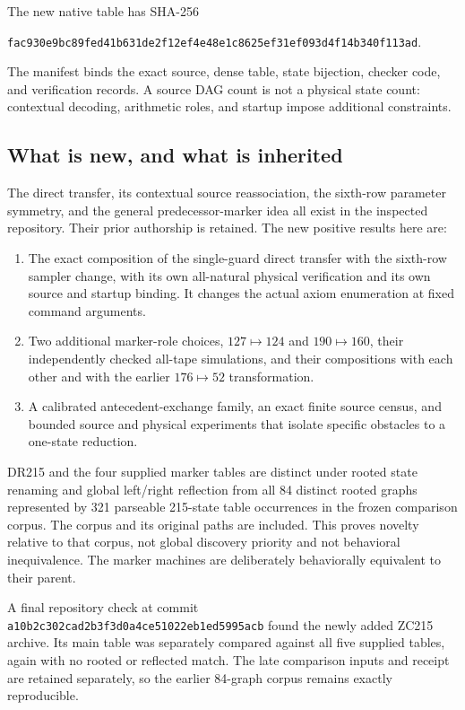 \documentclass[11pt,a4paper]{article}
\theoremstyle{definition}
\numberwithin{equation}{section}
\begin{document}
The new native table has SHA-256
\begin{center}\small
\texttt{fac930e9bc89fed41b631de2f12ef4e48e1c8625ef31ef093d4f14b340f113ad}.
\end{center}
The manifest binds the exact source, dense table, state bijection, checker
code, and verification records. A source DAG count is not a physical state
count: contextual decoding, arithmetic roles, and startup impose additional
constraints.

\subsection{What is new, and what is inherited}

The direct transfer, its contextual source reassociation, the sixth-row
parameter symmetry, and the general predecessor-marker idea all exist in
the inspected repository. Their prior authorship is retained. The new
positive results here are:

\begin{enumerate}
\item The exact composition of the single-guard direct transfer with the
sixth-row sampler change, with its own all-natural physical verification
and its own source and startup binding. It changes the actual axiom
enumeration at fixed command arguments.
\item Two additional marker-role choices, $127\mapsto124$ and
$190\mapsto160$, their independently checked all-tape simulations, and
their compositions with each other and with the earlier $176\mapsto52$
transformation.
\item A calibrated antecedent-exchange family, an exact finite source
census, and bounded source and physical experiments that isolate specific
obstacles to a one-state reduction.
\end{enumerate}

DR215 and the four supplied marker tables are distinct under rooted state
renaming and global left/right reflection from all 84 distinct rooted
graphs represented by 321 parseable 215-state table occurrences in the
frozen comparison corpus. The corpus and its original paths are included.
This proves novelty relative to that corpus, not global discovery priority
and not behavioral inequivalence. The marker machines are deliberately
behaviorally equivalent to their parent.

A final repository check at commit
\texttt{a10b2c302cad2b3f3d0a4ce51022eb1ed5995acb} found the newly
added ZC215 archive. Its main table was separately compared against all
five supplied tables, again with no rooted or reflected match. The late
comparison inputs and receipt are retained separately, so the earlier
84-graph corpus remains exactly reproducible.
\end{document}
